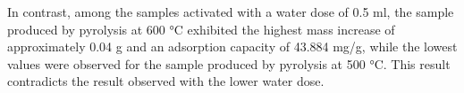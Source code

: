 
\vspace{0.3em}

In contrast, among the samples activated with a water dose of 0.5 ml, the sample produced by pyrolysis at 600 °C exhibited the highest mass increase of approximately 0.04 g and an adsorption capacity of 43.884 mg/g, while the lowest values were observed for the sample produced by pyrolysis at 500 °C. This result contradicts the result observed with the lower water dose. 



\vspace{0.3em}


